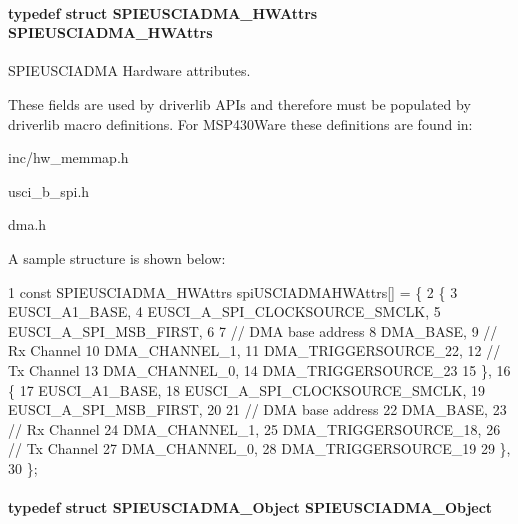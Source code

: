 \paragraph[{S\+P\+I\+E\+U\+S\+C\+I\+A\+D\+M\+A\+\_\+\+H\+W\+Attrs}]{\setlength{\rightskip}{0pt plus 5cm}typedef struct {\bf S\+P\+I\+E\+U\+S\+C\+I\+A\+D\+M\+A\+\_\+\+H\+W\+Attrs}  {\bf S\+P\+I\+E\+U\+S\+C\+I\+A\+D\+M\+A\+\_\+\+H\+W\+Attrs}}\label{_s_p_i_e_u_s_c_i_a_d_m_a_8h_a6568ba84990eb85b7857fad2ad8b7287}


S\+P\+I\+E\+U\+S\+C\+I\+A\+D\+M\+A Hardware attributes. 

These fields are used by driverlib A\+P\+Is and therefore must be populated by driverlib macro definitions. For M\+S\+P430\+Ware these definitions are found in\+:
\begin{DoxyItemize}
\item inc/hw\+\_\+memmap.\+h
\item usci\+\_\+b\+\_\+spi.\+h
\item dma.\+h
\end{DoxyItemize}

A sample structure is shown below\+: 
\begin{DoxyCode}
1 const SPIEUSCIADMA\_HWAttrs spiUSCIADMAHWAttrs[] = \{
2     \{
3         EUSCI\_A1\_BASE,
4         EUSCI\_A\_SPI\_CLOCKSOURCE\_SMCLK,
5         EUSCI\_A\_SPI\_MSB\_FIRST,
6 
7         // DMA base address
8         DMA\_BASE,
9         // Rx Channel
10         DMA\_CHANNEL\_1,
11         DMA\_TRIGGERSOURCE\_22,
12         // Tx Channel
13         DMA\_CHANNEL\_0,
14         DMA\_TRIGGERSOURCE\_23
15     \},
16     \{
17         EUSCI\_A1\_BASE,
18         EUSCI\_A\_SPI\_CLOCKSOURCE\_SMCLK,
19         EUSCI\_A\_SPI\_MSB\_FIRST,
20 
21         // DMA base address
22         DMA\_BASE,
23         // Rx Channel
24         DMA\_CHANNEL\_1,
25         DMA\_TRIGGERSOURCE\_18,
26         // Tx Channel
27         DMA\_CHANNEL\_0,
28         DMA\_TRIGGERSOURCE\_19
29     \},
30 \};
\end{DoxyCode}
\paragraph[{S\+P\+I\+E\+U\+S\+C\+I\+A\+D\+M\+A\+\_\+\+Object}]{\setlength{\rightskip}{0pt plus 5cm}typedef struct {\bf S\+P\+I\+E\+U\+S\+C\+I\+A\+D\+M\+A\+\_\+\+Object}  {\bf S\+P\+I\+E\+U\+S\+C\+I\+A\+D\+M\+A\+\_\+\+Object}}\label{_s_p_i_e_u_s_c_i_a_d_m_a_8h_a4126d5130238bf5228a4b403e75108e7}


